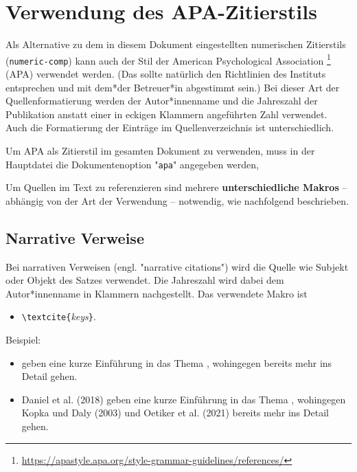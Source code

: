 \section{Verwendung des APA-Zitierstils}

\begin{sloppypar}
Als Alternative zu dem in diesem Dokument eingestellten numerischen Zitierstils (\texttt{numeric-comp}) kann auch
der Stil der American Psychological Association%
\footnote{\url{https://apastyle.apa.org/style-grammar-guidelines/references/}}
(APA) verwendet werden. (Das sollte natürlich den Richtlinien des Instituts entsprechen und mit dem*der Betreuer*in
abgestimmt sein.) Bei dieser Art der Quellenformatierung werden der Autor*innenname und die Jahreszahl der
Publikation anstatt einer in eckigen Klammern angeführten Zahl verwendet. Auch die Formatierung der Einträge im
Quellenverzeichnis ist unterschiedlich.
\end{sloppypar}

Um APA als Zitierstil im gesamten Dokument zu verwenden, muss in der Hauptdatei die Dokumenten\-option "\texttt{apa}"
angegeben werden, \zB
%
%
Um Quellen im Text zu referenzieren sind mehrere \textbf{unterschiedliche Makros} -- abhängig von der Art der
Verwendung -- notwendig, wie nachfolgend beschrieben.


\subsection{Narrative Verweise}

Bei narrativen Verweisen (engl. "narrative citations") wird die Quelle wie Subjekt oder Objekt des Satzes verwendet.
Die Jahreszahl wird dabei dem Autor*innenname in Klammern nachgestellt. Das verwendete Makro ist
%
\begin{itemize}
\item[] \verb!\textcite{!\textit{keys}\verb!}!.
\end{itemize}
%
Beispiel:
%
\begin{itemize}
\item[]
\begin{LaTeXCode}[numbers=none,breakindent=0pt]
	\textcite{Daniel2018} geben eine kurze Einführung in das Thema \latex, wohingegen \textcite{Oetiker2021,
		Kopka2003} bereits mehr ins Detail gehen.
\end{LaTeXCode}
\item[]
Daniel et al. (2018) geben eine kurze Einführung in das Thema \latex, wohingegen Kopka und Daly (2003) und Oetiker et
al. (2021) bereits mehr ins Detail gehen.
\end{itemize}


